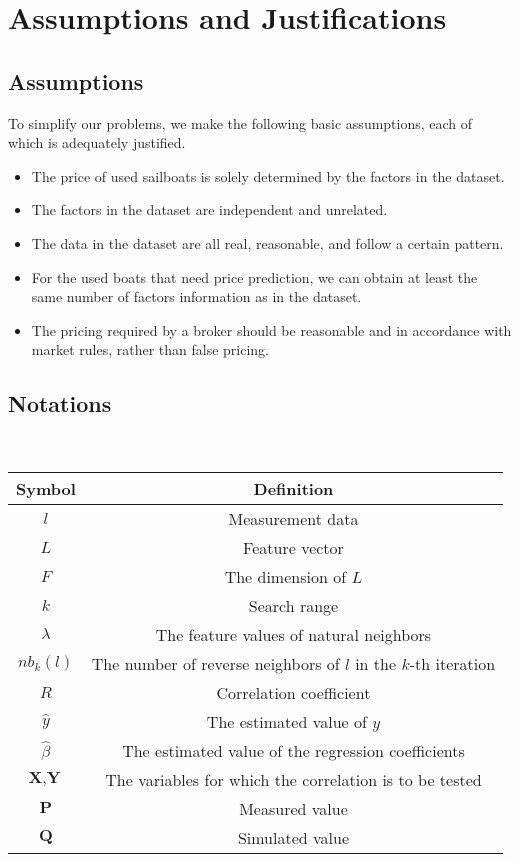 \documentclass[12pt]{article}  %
\begin{document}
\section{Assumptions and Justifications}
\subsection{Assumptions}
To simplify our problems, we make the following basic assumptions, each of which is
adequately justified.
\begin{itemize}
    \item The price of used sailboats is solely determined by the factors in the dataset.
    \item The factors in the dataset are independent and unrelated.
    \item The data in the dataset are all real, reasonable, and follow a certain pattern.
    \item For the used boats that need price prediction, we can obtain at least the same number of factors information as in the dataset.
    \item The pricing required by a broker should be reasonable and in accordance with market rules, rather than false pricing.
\end{itemize}
\subsection{Notations}
\ 
\begin{table}[!htbp]
\begin{center}
\begin{tabular}{cc}
	\toprule
	\multicolumn{1}{m{3cm}}{\centering Symbol}
	&\multicolumn{1}{m{8cm}}{\centering Definition}\\
	\midrule
	$l$ &Measurement data\\
	$L$ &Feature vector\\
	$F$ &The dimension of $L$\\
    $k$ &Search range\\
    $\lambda$ & The feature values of natural neighbors\\
    $nb_k(l)$ & The number of reverse neighbors of $l$ in the $k$-th iteration\\
    $R$ & Correlation coefficient\\
    $\hat{y}$ & The estimated value of $y$\\
    $\hat{\beta}$ & The estimated value of the regression coefficients\\
    $\textbf{X}, \textbf{Y}$ & The variables for which the correlation is to be tested \\
    $\textbf{P}$ & Measured value \\
    $\textbf{Q}$ & Simulated value \\ 
	\bottomrule
\end{tabular}
\end{center}
\end{table}
\end{document}
